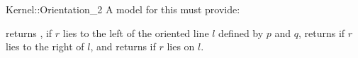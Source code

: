 \begin{ccRefFunctionObjectConcept}{Kernel::Orientation_2}
A model for this must provide:


{returns , if $r$ lies to the left of the oriented 
line $l$ defined by $p$ and $q$, returns  if $r$ 
lies to the right of $l$, and returns  if $r$ lies
on $l$.}

\end{ccRefFunctionObjectConcept}
